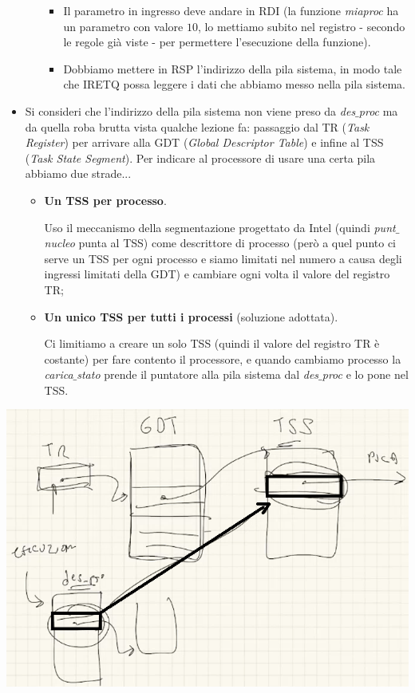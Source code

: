 \documentclass[11pt]{report}
\theoremstyle{definition}
\begin{document}
\begin{itemize}
\begin{itemize}
\begin{itemize}
			\item Il parametro in ingresso deve andare in RDI (la funzione \emph{miaproc} ha un parametro con valore $10$, lo mettiamo subito nel registro - secondo le regole già viste - per permettere l'esecuzione della funzione).
			\item Dobbiamo mettere in RSP l'indirizzo della pila sistema, in modo tale che IRETQ possa leggere i dati che abbiamo messo nella pila sistema.
		\end{itemize}
	\end{itemize}
	\item Si consideri che l'indirizzo della pila sistema non viene preso da \emph{des$\_$proc} ma da quella roba brutta vista qualche lezione fa: passaggio dal TR (\emph{Task Register}) per arrivare alla GDT (\emph{Global Descriptor Table}) e infine al TSS (\emph{Task State Segment}). Per indicare al processore di usare una certa pila abbiamo due strade...
	\begin{itemize}
		\item \textbf{Un TSS per processo}.
		
		Uso il meccanismo della segmentazione progettato da Intel (quindi \emph{punt$\_$nucleo} punta al TSS) come descrittore di processo (però a quel punto ci serve un TSS per ogni processo e siamo limitati nel numero a causa degli ingressi limitati della GDT) e cambiare ogni volta il valore del registro TR;
		\item \textbf{Un unico TSS per tutti i processi} (soluzione adottata).
		
		Ci limitiamo a creare un solo TSS (quindi il valore del registro TR è costante) per fare contento il processore, e quando cambiamo processo la \emph{carica$\_$stato} prende il puntatore alla pila sistema dal \emph{des$\_$proc} e lo pone nel TSS.
	\end{itemize}
\end{itemize}

\begin{center}\includegraphics[scale=.65]{img/170.PNG}\end{center}
\end{document}
